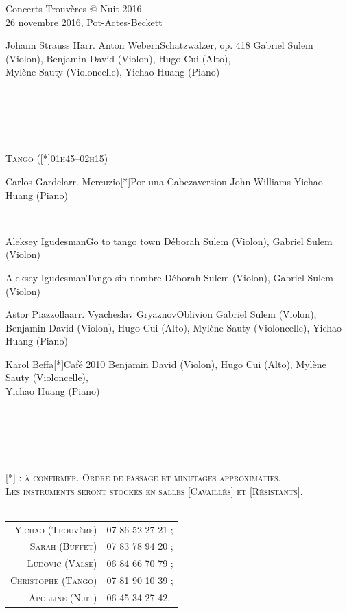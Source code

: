\documentclass[a4paper,11pt,poets,durations]{ConcProg}
\begin{document}
{\begin{programme}{
    Concerts Trouvères @ Nuit 2016
\\  {\normalsize 26 novembre 2016, Pot-Actes-Beckett}
}
\begin{part}[]
\begin{composition}{Johann Strauss II}{arr. Anton Webern}{Schatzwalzer, op. 418}{}
      {\small Gabriel Sulem (Violon), Benjamin David (Violon), Hugo Cui (Alto),\\Mylène Sauty (Violoncelle), Yichao Huang (Piano)}
    \end{composition}\\
~\\
~\\
~\\
\begin{center}
\textsc{Tango ([*]01h45--02h15)}
\end{center}
    \begin{composition}{Carlos Gardel}{arr. Mercuzio}{[*]Por una Cabeza}{version John Williams}
      {\small Yichao Huang (Piano)}
    \end{composition}\\
    \begin{composition}{Aleksey Igudesman}{}{Go to tango town}{}
      {\small Déborah Sulem (Violon), Gabriel Sulem (Violon)}
    \end{composition}
    \begin{composition}{Aleksey Igudesman}{}{Tango sin nombre}{}
      {\small Déborah Sulem (Violon), Gabriel Sulem (Violon)}
    \end{composition}
    \begin{composition}{Astor Piazzolla}{arr. Vyacheslav Gryaznov}{Oblivion}{}
      {\small Gabriel Sulem (Violon), Benjamin David (Violon), Hugo Cui (Alto), Mylène Sauty (Violoncelle), Yichao Huang (Piano)}
    \end{composition}
    \begin{composition}{Karol Beffa}{}{[*]Café 2010}{}
      {\small Benjamin David (Violon), Hugo Cui (Alto), Mylène Sauty (Violoncelle),\\Yichao Huang (Piano)}
    \end{composition}\\
~\\
~\\
~\\
\begin{center}
\textsc{[*] : à confirmer. Ordre de passage et minutages approximatifs.\\Les instruments seront stockés en salles [Cavaillès] et [Résistants].}\\
~\\
\begin{tabular}{rl}
\textsc{Yichao (Trouvère)} & \textsc{07 86 52 27 21 ;}\\
\textsc{Sarah (Buffet)} & \textsc{07 83 78 94 20 ;}\\
\textsc{Ludovic (Valse)} & \textsc{06 84 66 70 79 ;}\\
\textsc{Christophe (Tango)} & \textsc{07 81 90 10 39 ;}\\
\textsc{Apolline (Nuit)} & \textsc{06 45 34 27 42.}
\end{tabular}
\end{center}
  \end{part}
\end{programme}
}
\end{document}
